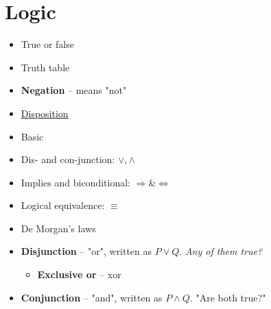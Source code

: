 \documentclass[english,10pt,a4paper]{article}
\begin{document}
\newpage
\section{Logic}
\begin{minipage}{0.65\linewidth}
\begin{theo}[Basic] 
\begin{itemize}
\item True or false
\item Truth table
\item \textbf{Negation} -- means "not"
\end{itemize}
\end{theo}
\end{minipage}
\hspace{0.10cm}
\begin{minipage}{0.3\linewidth}
\begin{itemize}
\item[] \underline{Disposition}
\item Basic
\item Dis- and con-junction: $\vee, \wedge$
\item Implies and biconditional: $\Rightarrow \& \Leftrightarrow$
\item Logical equivalence: $\equiv$
\item De Morgan's laws
\end{itemize}
\end{minipage}

\begin{theo} 
\begin{itemize}
\item \textbf{Disjunction} -- "or", written as $P \vee Q$. \textit{Any of them true?}
\begin{itemize}
\item \textbf{Exclusive or} -- xor
\end{itemize}
\item \textbf{Conjunction} -- "and", written as $P\wedge Q$. "Are both true?"
\end{itemize}
\end{theo}
\end{document}
